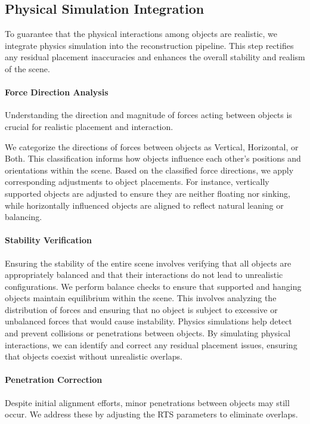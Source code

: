 \subsection{Physical Simulation Integration}
To guarantee that the physical interactions among objects are realistic, we integrate physics simulation into the reconstruction pipeline. This step rectifies any residual placement inaccuracies and enhances the overall stability and realism of the scene.

\paragraph{Force Direction Analysis}
Understanding the direction and magnitude of forces acting between objects is crucial for realistic placement and interaction.

We categorize the directions of forces between objects as Vertical, Horizontal, or Both. This classification informs how objects influence each other's positions and orientations within the scene. Based on the classified force directions, we apply corresponding adjustments to object placements. For instance, vertically supported objects are adjusted to ensure they are neither floating nor sinking, while horizontally influenced objects are aligned to reflect natural leaning or balancing.

\paragraph{Stability Verification}
Ensuring the stability of the entire scene involves verifying that all objects are appropriately balanced and that their interactions do not lead to unrealistic configurations. We perform balance checks to ensure that supported and hanging objects maintain equilibrium within the scene. This involves analyzing the distribution of forces and ensuring that no object is subject to excessive or unbalanced forces that would cause instability. Physics simulations help detect and prevent collisions or penetrations between objects. By simulating physical interactions, we can identify and correct any residual placement issues, ensuring that objects coexist without unrealistic overlaps.

\paragraph{Penetration Correction}
Despite initial alignment efforts, minor penetrations between objects may still occur. We address these by adjusting the RTS parameters to eliminate overlaps.

